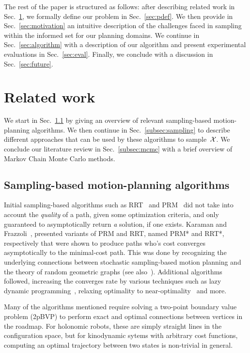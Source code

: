 \documentclass[letterpaper, 10 pt, conference]{ieeeconf}  %
\begin{document}
The rest of the paper is structured as follows: after describing related work in Sec.~\ref{sec:related_work}, we formally define our problem in Sec.~\ref{sec:pdef}.
We then provide in Sec.~\ref{sec:motivation} an intuitive description of the challenges faced in sampling within the informed set for our planning domains.
We continue in Sec.~\ref{sec:algorithm} with a description of our algorithm and present experimental evaluations in Sec.~\ref{sec:eval}.
Finally, we conclude with a discussion in Sec.~\ref{sec:future}.


\section{Related work}
\label{sec:related_work}
We start in Sec.~\ref{subsec:planning} by giving an overview of relevant sampling-based motion-planning algorithms.
We then continue in Sec.~\ref{subsec:sampling} to describe different approaches that can be used by  these algorithms to sample~$\mathcal{X}$.
We conclude our literature review in Sec.~\ref{subsec:mcmc} with a brief overview of Markov Chain Monte Carlo methods.

\subsection{Sampling-based motion-planning algorithms}
\label{subsec:planning}
Initial sampling-based algorithms such as RRT~\cite{LK01} and PRM~\cite{KSLO96} did not take into account the \emph{quality} of a path, given some optimization criteria, and only guaranteed to asymptotically return \emph{a} solution, if one exists.
Karaman and Frazzoli~\cite{KF11}, presented variants of PRM and RRT, named PRM* and RRT*, respectively that were shown to produce paths who's cost converges asymptotically to the minimal-cost path.
This was done by recognizing the underlying connections between stochastic sampling-based motion planning and the theory of random geometric graphs (see also~\cite{SSH16}).
Additional algorithms followed, increasing the converges rate by various techniques such as 
lazy dynamic programming~\cite{GSB15, JSCP15, SH15},
relaxing optimality to near-optimality~\cite{DB14, SH16} 
and more.

Many of the algorithms mentioned require solving a two-point boundary value problem (2pBVP) to perform exact and optimal connections between vertices in the roadmap.
For holonomic robots, these are simply straight lines in the configuration space, but for kinodynamic sytems with arbitrary cost functions,  computing an optimal trajectory between two states is non-trivial in general.
\end{document}
